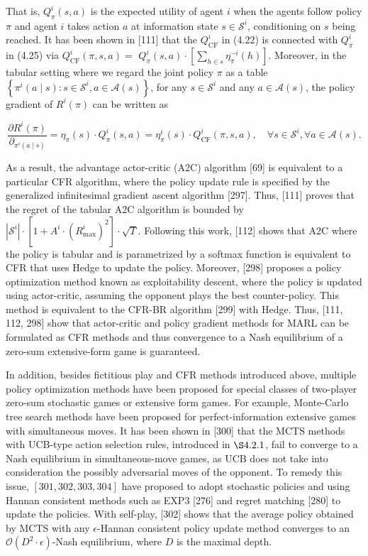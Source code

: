 \documentclass[10pt]{article}
\begin{document}
That is, $Q_{\pi}^{i}(s, a)$ is the expected utility of agent $i$ when the agents follow policy $\pi$ and agent $i$ takes action $a$ at information state $s \in \mathcal{S}^{i}$, conditioning on $s$ being reached. It has been shown in [111] that the $Q_{\mathrm{CF}}^{i}$ in (4.22) is connected with $Q_{\pi}^{i}$ in (4.25) via $Q_{\mathrm{CF}}^{i}(\pi, s, a)=$ $Q_{\pi}^{i}(s, a) \cdot\left[\sum_{h \in s} \eta_{\pi}^{-i}(h)\right]$. Moreover, in the tabular setting where we regard the joint policy $\pi$ as a table $\left\{\pi^{i}(a \mid s): s \in \mathcal{S}^{i}, a \in \mathcal{A}(s)\right\}$, for any $s \in \mathcal{S}^{i}$ and any $a \in \mathcal{A}(s)$, the policy gradient of $R^{i}(\pi)$ can be written as

\[
\frac{\partial R^{i}(\pi)}{\partial_{\pi^{i}(a \mid s)}}=\eta_{\pi}(s) \cdot Q_{\pi}^{i}(s, a)=\eta_{\pi}^{i}(s) \cdot Q_{\mathrm{CF}}^{i}(\pi, s, a), \quad \forall s \in \mathcal{S}^{i}, \forall a \in \mathcal{A}(s) .
\]

As a result, the advantage actor-critic (A2C) algorithm [69] is equivalent to a particular CFR algorithm, where the policy update rule is specified by the generalized infinitesimal gradient ascent algorithm [297]. Thus, [111] proves that the regret of the tabular A2C algorithm is bounded by $\left|\mathcal{S}^{i}\right| \cdot\left[1+A^{i} \cdot\left(R_{\max }^{i}\right)^{2}\right] \cdot \sqrt{T}$. Following this work, [112] shows that A2C where the policy is tabular and is parametrized by a softmax function is equivalent to CFR that uses Hedge to update the policy. Moreover, [298] proposes a policy optimization method known as exploitability descent, where the policy is updated using actor-critic, assuming the opponent plays the best counter-policy. This method is equivalent to the CFR-BR algorithm [299] with Hedge. Thus, [111, 112, 298] show that actor-critic and policy gradient methods for MARL can be formulated as CFR methods and thus convergence to a Nash equilibrium of a zero-sum extensive-form game is guaranteed.

In addition, besides fictitious play and CFR methods introduced above, multiple policy optimization methods have been proposed for special classes of two-player zero-sum stochastic games or extensive form games. For example, Monte-Carlo tree search methods have been proposed for perfect-information extensive games with simultaneous moves. It has been shown in [300] that the MCTS methods with UCB-type action selection rules, introduced in $\S 4.2 .1$, fail to converge to a Nash equilibrium in simultaneous-move games, as UCB does not take into consideration the possibly adversarial moves of the opponent. To remedy this issue, $[301,302,303,304]$ have proposed to adopt stochastic policies and using Hannan consistent methods such as EXP3 [276] and regret matching [280] to update the policies. With self-play, [302] shows that the average policy obtained by MCTS with any $\epsilon$-Hannan consistent policy update method converges to an $\mathcal{O}\left(D^{2} \cdot \epsilon\right)$-Nash equilibrium, where $D$ is the maximal depth.
\end{document}
